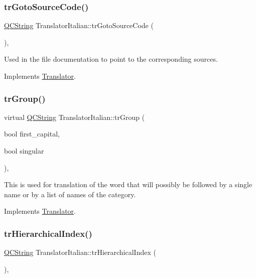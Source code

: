 \subsubsection{\texorpdfstring{trGotoSourceCode()}{trGotoSourceCode()}}
{\footnotesize\ttfamily \mbox{\hyperlink{class_q_c_string}{Q\+C\+String}} Translator\+Italian\+::tr\+Goto\+Source\+Code (\begin{DoxyParamCaption}{ }\end{DoxyParamCaption})\hspace{0.3cm}{\ttfamily [inline]}, {\ttfamily [virtual]}}

Used in the file documentation to point to the corresponding sources. 

Implements \mbox{\hyperlink{class_translator}{Translator}}.

\mbox{\label{class_translator_italian_a3d3b18c55cbaac586b581333a90023ac}} 
\subsubsection{\texorpdfstring{trGroup()}{trGroup()}}
{\footnotesize\ttfamily virtual \mbox{\hyperlink{class_q_c_string}{Q\+C\+String}} Translator\+Italian\+::tr\+Group (\begin{DoxyParamCaption}\item[{bool}]{first\+\_\+capital,  }\item[{bool}]{singular }\end{DoxyParamCaption})\hspace{0.3cm}{\ttfamily [inline]}, {\ttfamily [virtual]}}

This is used for translation of the word that will possibly be followed by a single name or by a list of names of the category. 

Implements \mbox{\hyperlink{class_translator}{Translator}}.

\mbox{\label{class_translator_italian_ad0e07313efe09f47ed07d179e9cd6627}} 
\subsubsection{\texorpdfstring{trHierarchicalIndex()}{trHierarchicalIndex()}}
{\footnotesize\ttfamily \mbox{\hyperlink{class_q_c_string}{Q\+C\+String}} Translator\+Italian\+::tr\+Hierarchical\+Index (\begin{DoxyParamCaption}{ }\end{DoxyParamCaption})\hspace{0.3cm}{\ttfamily [inline]}, {\ttfamily [virtual]}}

